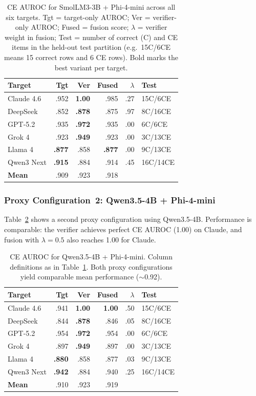 \documentclass[12pt,twocolumn]{article}
\begin{document}
\begin{table}[H]
\centering
\scriptsize
\begin{tabular}{lrrrrl}
\toprule
Target & Tgt & Ver & Fused & $\lambda$ & Test \\
\midrule
Claude 4.6  & .952 & \textbf{1.00} & .985 & .27 & 15C/6CE \\
DeepSeek    & .852 & \textbf{.878} & .875 & .97 & 8C/16CE \\
GPT-5.2     & .935 & \textbf{.972} & .935 & .00 & 6C/6CE \\
Grok 4      & .923 & \textbf{.949} & .923 & .00 & 3C/13CE \\
Llama 4     & \textbf{.877} & .858 & \textbf{.877} & .00 & 9C/13CE \\
Qwen3 Next  & \textbf{.915} & .884 & .914 & .45 & 16C/14CE \\
\midrule
\textbf{Mean} & .909 & .923 & .918 & & \\
\bottomrule
\end{tabular}
\caption{CE AUROC for SmolLM3-3B + Phi-4-mini across all six targets.
Tgt = target-only AUROC; Ver = verifier-only AUROC; Fused = fusion
score; $\lambda$ = verifier weight in fusion; Test = number of
correct (C) and CE items in the held-out test partition (e.g.\
15C/6CE means 15 correct rows and 6 CE rows). Bold marks the best
variant per target.}
\label{tab:wb_smollm}
\end{table}

\subsubsection{Proxy Configuration~2: Qwen3.5-4B + Phi-4-mini}

Table~\ref{tab:wb_qwen} shows a second proxy configuration using
Qwen3.5-4B. Performance is comparable: the verifier achieves
perfect CE AUROC (1.00) on Claude, and fusion with
$\lambda = 0.5$ also reaches 1.00 for Claude.

\begin{table}[H]
\centering
\scriptsize
\begin{tabular}{lrrrrl}
\toprule
Target & Tgt & Ver & Fused & $\lambda$ & Test \\
\midrule
Claude 4.6  & .941 & \textbf{1.00} & \textbf{1.00} & .50 & 15C/6CE \\
DeepSeek    & .844 & \textbf{.878} & .846 & .05 & 8C/16CE \\
GPT-5.2     & .954 & \textbf{.972} & .954 & .00 & 6C/6CE \\
Grok 4      & .897 & \textbf{.949} & .897 & .00 & 3C/13CE \\
Llama 4     & \textbf{.880} & .858 & .877 & .03 & 9C/13CE \\
Qwen3 Next  & \textbf{.942} & .884 & .940 & .25 & 16C/14CE \\
\midrule
\textbf{Mean} & .910 & .923 & .919 & & \\
\bottomrule
\end{tabular}
\caption{CE AUROC for Qwen3.5-4B + Phi-4-mini. Column definitions
as in Table~\ref{tab:wb_smollm}. Both proxy configurations yield
comparable mean performance ($\sim$0.92).}
\label{tab:wb_qwen}
\end{table}
\end{document}
